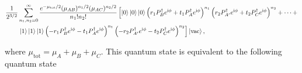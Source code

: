 \documentclass[aps,twocolumn,superscriptaddress,showpacs,nofootinbib]{revtex4-2}
\renewcommand{\i}{\mathrm{i}}
\begin{document}
\begin{widetext}
\begin{equation}
\begin{split}
\frac{1}{2^{3/2}}&
\sum_{n_1,n_2=0}^{\infty} \frac{e^{-\mu_\text{tot}/2}(\mu_{AB})^{n_1/2}(\mu_{AC})^{n_2/2}}{n_1!n_2!} \left[ \ket{0}\ket{0}\ket{0} \left( r_1 P^\dagger_B e^{\i \phi} + t_1 P^\dagger_{A} e^{\i \phi} \right)^{n_1} \left( r_2 P^\dagger_{A'} e^{\i \phi} + t_2 P^\dagger_C e^{\i \phi} \right)^{n_2} + \cdots+ \right.\\
&\left.\ket{1}\ket{1}\ket{1}
\left( -r_1 P^\dagger_B e^{\i \phi} - t_1 P^\dagger_{A} e^{\i \phi} \right)^{n_1}\left( - r_2 P^\dagger_{A'} e^{\i \phi} - t_2 P^\dagger_C e^{\i \phi} \right)^{n_2} \right] \ket{\text{vac}},
\end{split}
\end{equation}

where $\mu_\text{tot} = \mu_A + \mu_B + \mu_C$. This quantum state is equivalent to the following quantum state


\end{widetext}
\end{document}
